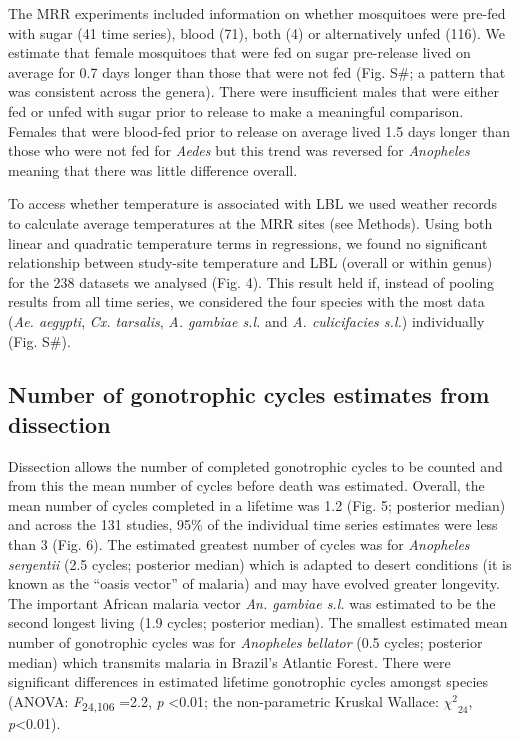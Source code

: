 \documentclass[]{article}
\begin{document}
The MRR experiments included information on whether mosquitoes were
pre-fed with sugar (41 time series), blood (71), both (4) or
alternatively unfed (116). We estimate that female mosquitoes that were
fed on sugar pre-release lived on average for 0.7 days longer than those
that were not fed (Fig. S\#; a pattern that was consistent across the
genera). There were insufficient males that were either fed or unfed
with sugar prior to release to make a meaningful comparison. Females
that were blood-fed prior to release on average lived 1.5 days longer
than those who were not fed for \emph{Aedes} but this trend was reversed
for \emph{Anopheles} meaning that there was little difference overall.

To access whether temperature is associated with LBL we used weather
records to calculate average temperatures at the MRR sites (see
Methods). Using both linear and quadratic temperature terms in
regressions, we found no significant relationship between study-site
temperature and LBL (overall or within genus) for the 238 datasets we
analysed (Fig. 4). This result held if, instead of pooling results from
all time series, we considered the four species with the most data
(\emph{Ae. aegypti}, \emph{Cx. tarsalis}, \emph{A. gambiae s.l.} and
\emph{A. culicifacies s.l.}) individually (Fig. S\#).

\subsection{Number of gonotrophic cycles estimates from
dissection}\label{number-of-gonotrophic-cycles-estimates-from-dissection}

Dissection allows the number of completed gonotrophic cycles to be
counted and from this the mean number of cycles before death was
estimated. Overall, the mean number of cycles completed in a lifetime
was 1.2 (Fig. 5; posterior median) and across the 131 studies, 95\% of
the individual time series estimates were less than 3 (Fig. 6). The
estimated greatest number of cycles was for \emph{Anopheles sergentii}
(2.5 cycles; posterior median) which is adapted to desert conditions (it
is known as the ``oasis vector'' of malaria) and may have evolved
greater longevity. The important African malaria vector \emph{An.
gambiae s.l.} was estimated to be the second longest living (1.9 cycles;
posterior median). The smallest estimated mean number of gonotrophic
cycles was for \emph{Anopheles} \emph{bellator} (0.5 cycles; posterior
median) which transmits malaria in Brazil's Atlantic Forest. There were
significant differences in estimated lifetime gonotrophic cycles amongst
species (ANOVA: \emph{F}\textsubscript{24,106} =2.2, \emph{p}
\textless{}0.01; the non-parametric Kruskal Wallace:
\({\chi^{2}}_{24}\), \emph{p}\textless{}0.01).
\end{document}
